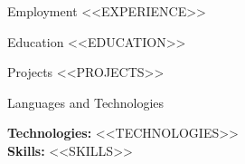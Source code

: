 \documentclass[]{mcdowellcv}
\begin{document}
\thispagestyle{empty}  %
\makeheader

\begin{cvsection}{Employment}
<<EXPERIENCE>>
\end{cvsection}

\begin{cvsection}{Education}
<<EDUCATION>>
\end{cvsection}

\begin{cvsection}{Projects}
<<PROJECTS>>
\end{cvsection}

\begin{cvsection}{Languages and Technologies}

\vspace{0.5em}
\textbf{Technologies:} <<TECHNOLOGIES>> \\[0.5em]
\textbf{Skills:} <<SKILLS>>

\end{cvsection}
\end{document}
